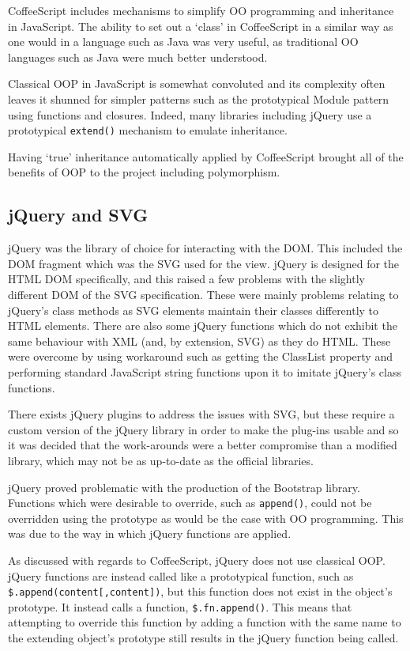 Coffee\-Script includes mechanisms to simplify OO programming and inheritance in Java\-Script. The ability to set out a `class' in Coffee\-Script in a similar way as one would in a language such as Java was very useful, as traditional OO languages such as Java were much better understood.

Classical OOP in Java\-Script is somewhat convoluted and its complexity often leaves it shunned for simpler patterns such as the prototypical Module pattern using functions and closures. Indeed, many libraries including jQuery use a prototypical \texttt{extend()} mechanism to emulate inheritance.

Having `true' inheritance automatically applied by Coffee\-Script brought all of the benefits of OOP to the project including 
polymorphism.

\subsection{jQuery and SVG}
jQuery was the library of choice for interacting with the DOM. This included the DOM fragment which was the SVG used for the view. jQuery is designed for the HTML DOM specifically, and this raised a few problems with the slightly different DOM of the SVG specification. These were mainly problems relating to jQuery's class methods as SVG elements maintain their classes differently to HTML elements. There are also some jQuery functions which do not exhibit the same behaviour with XML (and, by extension, SVG) as they do HTML. These were overcome by using workaround such as getting the ClassList property and performing standard Java\-Script string functions upon it to imitate jQuery's class functions.

There exists jQuery plugins to address the issues with SVG, but these require a custom version of the jQuery library in order to make the plug-ins usable and so it was decided that the work-arounds were a better compromise than a modified library, which may not be as up-to-date as the official libraries.

jQuery proved problematic with the production of the Bootstrap library. Functions which were desirable to override, such as \texttt{append()}, could not be overridden using the prototype as would be the case with OO programming. This was due to the way in which jQuery functions are applied.

As discussed with regards to Coffee\-Script, jQuery does not use classical OOP. jQuery functions are instead called like a prototypical function, such as \texttt{\$.append(content[,content])}, but this function does not exist in the object's prototype. It instead calls a function, \texttt{\$.fn.append()}. This means that attempting to override this function by adding a function with the same name to the extending object's prototype still results in the jQuery function being called.

